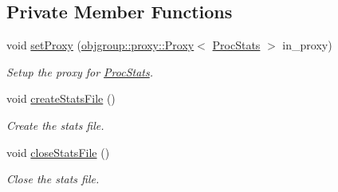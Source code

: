 \subsection*{Private Member Functions}
\begin{DoxyCompactItemize}
\item 
void \hyperlink{structvt_1_1vrt_1_1collection_1_1balance_1_1_proc_stats_a3215c14cb6679e9751b0fb51d5d72fe0}{set\+Proxy} (\hyperlink{structvt_1_1objgroup_1_1proxy_1_1_proxy}{objgroup\+::proxy\+::\+Proxy}$<$ \hyperlink{structvt_1_1vrt_1_1collection_1_1balance_1_1_proc_stats}{Proc\+Stats} $>$ in\+\_\+proxy)
\begin{DoxyCompactList}\small\item\em Setup the proxy for {\ttfamily \hyperlink{structvt_1_1vrt_1_1collection_1_1balance_1_1_proc_stats}{Proc\+Stats}}. \end{DoxyCompactList}\item 
void \hyperlink{structvt_1_1vrt_1_1collection_1_1balance_1_1_proc_stats_a03755a56bad3f32736c8f823671bc848}{create\+Stats\+File} ()
\begin{DoxyCompactList}\small\item\em Create the stats file. \end{DoxyCompactList}\item 
void \hyperlink{structvt_1_1vrt_1_1collection_1_1balance_1_1_proc_stats_a64048438517e6479b5c02f6136a19265}{close\+Stats\+File} ()
\begin{DoxyCompactList}\small\item\em Close the stats file. \end{DoxyCompactList}\end{DoxyCompactItemize}
